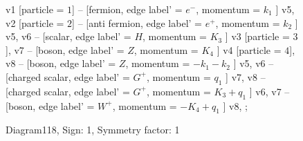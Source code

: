 \documentclass{revtex4}
\begin{document}
\begin{figure}[!htb]
\begin{center}
{    %
v1 [particle = \(1\)] -- [fermion, edge label' = \(e^{-}\), momentum = \(k_{1}\) ] v5, 
v2 [particle = \(2\)] -- [anti fermion, edge label' = \(e^{+}\), momentum = \(k_{2}\) ] v5, 
v6 -- [scalar, edge label' = \(H\), momentum = \(K_{3}\) ] v3 [particle = \(3\)], 
v7 -- [boson, edge label' = \(Z\), momentum = \(K_{4}\) ] v4 [particle = \(4\)], 
v8 -- [boson, edge label' = \(Z\), momentum = \(-k_{1} - k_{2}\) ] v5, 
v6 -- [charged scalar, edge label' = \(G^{+}\), momentum = \(q_{1}\) ] v7, 
v8 -- [charged scalar, edge label' = \(G^{+}\), momentum = \(K_{3} + q_{1}\) ] v6, 
v7 -- [boson, edge label' = \(W^{+}\), momentum = \(-K_{4} + q_{1}\) ] v8, 
};
\end{center}
\caption{Diagram118, Sign: 1, Symmetry factor: 1}
\end{figure}
\newpage
\end{document}
